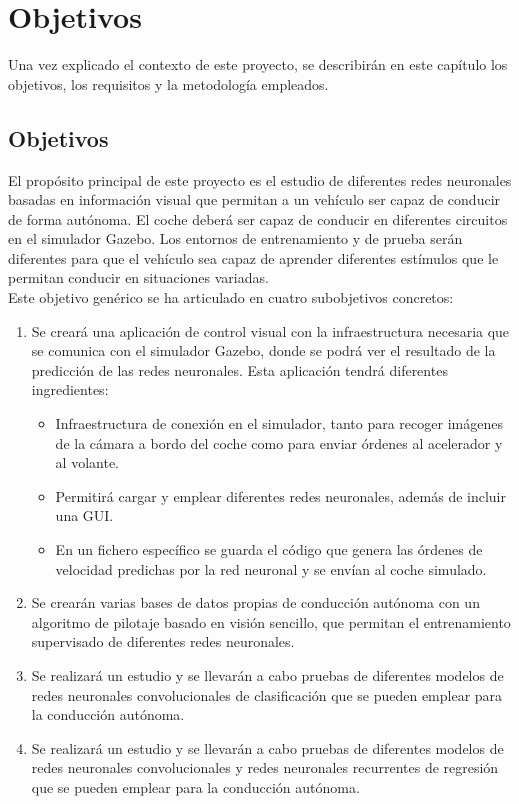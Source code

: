 \chapter{Objetivos}\label{cap.objetivos}

Una vez explicado el contexto de este proyecto, se describirán en este capítulo los objetivos, los requisitos y la metodología empleados.

\section{Objetivos}

El propósito principal de este proyecto es el estudio de diferentes redes neuronales basadas en información visual que permitan a un vehículo ser capaz de conducir de forma autónoma. El coche deberá ser capaz de conducir en diferentes circuitos en el simulador Gazebo. Los entornos de entrenamiento y de prueba serán diferentes para que el vehículo sea capaz de aprender diferentes estímulos que le permitan conducir en situaciones variadas.\\

Este objetivo genérico se ha articulado en cuatro subobjetivos concretos:

\begin{enumerate}
    \item Se creará una aplicación de control visual con la infraestructura necesaria que se comunica con el simulador Gazebo, donde se podrá ver el resultado de la predicción de las redes neuronales. Esta aplicación tendrá diferentes ingredientes: 

    \begin{itemize}
        \item Infraestructura de conexión en el simulador, tanto para recoger imágenes de la cámara a bordo del coche como para enviar órdenes al acelerador y al volante.
        \item Permitirá cargar y emplear diferentes redes neuronales, además de incluir una GUI.
        \item En un fichero específico se guarda el código que genera las órdenes de velocidad predichas por la red neuronal y se envían al coche simulado.
    \end{itemize}
    
    \item Se crearán varias bases de datos propias de conducción autónoma con un algoritmo de pilotaje basado en visión sencillo, que permitan el entrenamiento supervisado de diferentes redes neuronales.
    
    \item Se realizará un estudio y se llevarán a cabo pruebas de diferentes modelos de redes neuronales convolucionales de clasificación que se pueden emplear para la conducción autónoma. 
    
    \item Se realizará un estudio y se llevarán a cabo pruebas de diferentes modelos de redes neuronales convolucionales y redes neuronales recurrentes de regresión que se pueden emplear para la conducción autónoma. 

\end{enumerate}


